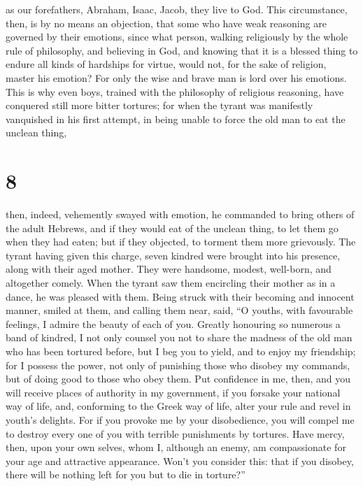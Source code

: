 as our forefathers, Abraham, Isaac, Jacob, they live to God.
 This circumstance, then, is by no means an objection, that
some who have weak reasoning are governed by their emotions,
 since what person, walking religiously by the whole rule
of philosophy, and believing in God,  and knowing that it
is a blessed thing to endure all kinds of hardships for virtue, would
not, for the sake of religion, master his emotion?  For
only the wise and brave man is lord over his emotions. 
This is why even boys, trained with the philosophy of religious
reasoning, have conquered still more bitter tortures;  for
when the tyrant was manifestly vanquished in his first attempt, in being
unable to force the old man to eat the unclean thing,

\hypertarget{section-7}{%
\section{8}\label{section-7}}

 then, indeed, vehemently swayed with emotion, he commanded
to bring others of the adult Hebrews, and if they would eat of the
unclean thing, to let them go when they had eaten; but if they objected,
to torment them more grievously.  The tyrant having given
this charge, seven kindred were brought into his presence, along with
their aged mother. They were handsome, modest, well-born, and altogether
comely.  When the tyrant saw them encircling their mother as
in a dance, he was pleased with them. Being struck with their becoming
and innocent manner, smiled at them, and calling them near, said,
 ``O youths, with favourable feelings, I admire the beauty
of each of you. Greatly honouring so numerous a band of kindred, I not
only counsel you not to share the madness of the old man who has been
tortured before,  but I beg you to yield, and to enjoy my
friendship; for I possess the power, not only of punishing those who
disobey my commands, but of doing good to those who obey them.
 Put confidence in me, then, and you will receive places of
authority in my government, if you forsake your national way of life,
 and, conforming to the Greek way of life, alter your rule
and revel in youth's delights.  For if you provoke me by
your disobedience, you will compel me to destroy every one of you with
terrible punishments by tortures.  Have mercy, then, upon
your own selves, whom I, although an enemy, am compassionate for your
age and attractive appearance.  Won't you consider this:
that if you disobey, there will be nothing left for you but to die in
torture?''

